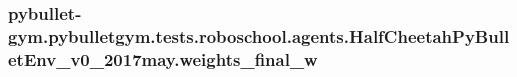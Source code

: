 \subsubsection[{\texorpdfstring{weights\+\_\+final\+\_\+w}{weights_final_w}}]{\setlength{\rightskip}{0pt plus 5cm}pybullet-\/gym.\+pybulletgym.\+tests.\+roboschool.\+agents.\+Half\+Cheetah\+Py\+Bullet\+Env\+\_\+v0\+\_\+2017may.\+weights\+\_\+final\+\_\+w}\hypertarget{namespacepybullet-gym_1_1pybulletgym_1_1tests_1_1roboschool_1_1agents_1_1_half_cheetah_py_bullet_env__v0__2017may_a06206f4511a76e54f393a3d1a958c34f}{}\label{namespacepybullet-gym_1_1pybulletgym_1_1tests_1_1roboschool_1_1agents_1_1_half_cheetah_py_bullet_env__v0__2017may_a06206f4511a76e54f393a3d1a958c34f}
